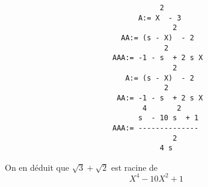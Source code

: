 \begin{enumerate}
\begin{verbatim}
                                    2    
                               A:= X  - 3
                                       2    
                           AA:= (s - X)  - 2
                                     2        
                         AAA:= -1 - s  + 2 s X
                                       2    
                            A:= (s - X)  - 2
                                     2        
                          AA:= -1 - s  + 2 s X
                                4       2    
                               s  - 10 s  + 1
                         AAA:= --------------
                                       2     
                                    4 s      

\end{verbatim}
On en déduit que $\sqrt{3}+\sqrt{2}$ est racine de 
\begin{displaymath}
 X^4-10X^2+1
\end{displaymath}
\end{enumerate}

